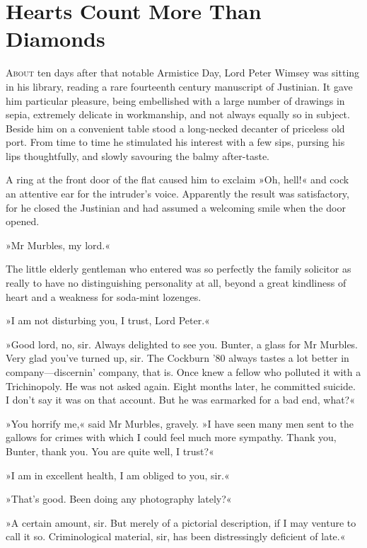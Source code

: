 \chapter{Hearts Count More Than Diamonds}
\lettrine[lines=4]{A}{bout} ten days after that notable Armistice Day, Lord Peter Wimsey was sitting in his library, reading a rare fourteenth century manuscript of Justinian. It gave him particular pleasure, being embellished with a large number of drawings in sepia, extremely delicate in workmanship, and not always equally so in subject. Beside him on a convenient table stood a long-necked decanter of priceless old port. From time to time he stimulated his interest with a few sips, pursing his lips thoughtfully, and slowly savouring the balmy after-taste.

A ring at the front door of the flat caused him to exclaim »Oh, hell!« and cock an attentive ear for the intruder's voice. Apparently the result was satisfactory, for he closed the Justinian and had assumed a welcoming smile when the door opened.

»Mr Murbles, my lord.«

The little elderly gentleman who entered was so perfectly the family solicitor as really to have no distinguishing personality at all, beyond a great kindliness of heart and a weakness for soda-mint lozenges.

»I am not disturbing you, I trust, Lord Peter.«

»Good lord, no, sir. Always delighted to see you. Bunter, a glass for Mr Murbles. Very glad you've turned up, sir. The Cockburn '80 always tastes a lot better in company\allowbreak---\allowbreak discernin' company, that is. Once knew a fellow who polluted it with a Trichinopoly. He was not asked again. Eight months later, he committed suicide. I don't say it was on that account. But he was earmarked for a bad end, what?«

»You horrify me,« said Mr Murbles, gravely. »I have seen many men sent to the gallows for crimes with which I could feel much more sympathy. Thank you, Bunter, thank you. You are quite well, I trust?«

»I am in excellent health, I am obliged to you, sir.«

»That's good. Been doing any photography lately?«

»A certain amount, sir. But merely of a pictorial description, if I may venture to call it so. Criminological material, sir, has been distressingly deficient of late.«


